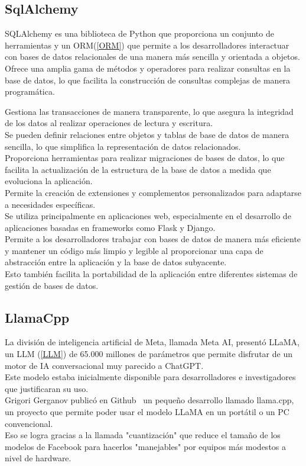 \subsection{SqlAlchemy~\cite{bayer2012sqlalchemy}}
SQLAlchemy es una biblioteca de Python que proporciona un conjunto de herramientas y
 un ORM(\ref{ORM}) que permite a los desarrolladores interactuar 
con bases de datos relacionales de una manera más sencilla y orientada a objetos.\\

Ofrece una amplia gama de métodos y operadores para realizar consultas en la base de datos, 
lo que facilita la construcción de consultas complejas de manera programática.

Gestiona las transacciones de manera transparente, lo que asegura la integridad 
de los datos al realizar operaciones de lectura y escritura.\\
Se pueden definir relaciones entre objetos y tablas de base de datos de manera sencilla,
 lo que simplifica la representación de datos relacionados.\\
Proporciona herramientas para realizar migraciones de bases de datos, 
lo que facilita la actualización de la estructura de la base de datos a medida 
que evoluciona la aplicación.\\
Permite la creación de extensiones y complementos personalizados 
para adaptarse a necesidades específicas.\\
Se utiliza principalmente en aplicaciones web, 
especialmente en el desarrollo de aplicaciones basadas en frameworks como Flask y Django. \\
Permite a los desarrolladores trabajar con bases de datos de manera más eficiente y 
mantener un código más limpio y legible al proporcionar una capa de abstracción entre la 
aplicación y la base de datos subyacente.\\ 
Esto también facilita la portabilidad de la aplicación entre diferentes sistemas de 
gestión de bases de datos.\\

\subsection{LlamaCpp~\cite{metallamaLM}}
La división de inteligencia artificial de Meta, llamada Meta AI, presentó LLaMA, un LLM (\ref{LLM}) de 
65.000 millones de parámetros que permite disfrutar de un motor de 
IA conversacional muy parecido a ChatGPT.\\
Este modelo estaba inicialmente disponible para desarrolladores e investigadores 
que justificaran su uso.\\
Grigori Gerganov publicó en Github~\cite{gerganovllamaCpp} un pequeño desarrollo llamado llama.cpp,
un proyecto que permite poder usar el modelo LLaMA en un portátil o un PC convencional.\\ 
Eso se logra gracias a la llamada "cuantización" que reduce el tamaño de los modelos de 
Facebook para hacerlos "manejables" por equipos más modestos a nivel de hardware.

